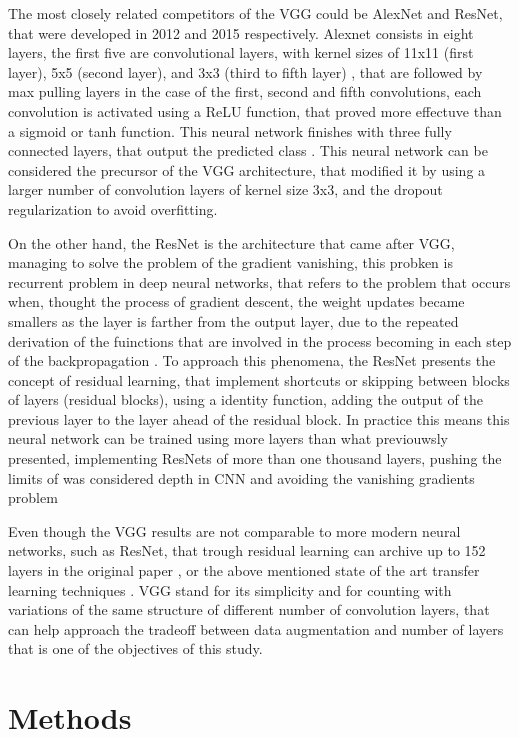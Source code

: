 \documentclass[10pt,twocolumn,letterpaper]{article}
\begin{document}
The most closely related competitors of the VGG could be AlexNet and ResNet, that were developed in 2012 and 2015 respectively. Alexnet consists in eight layers, the first five are convolutional layers, with kernel sizes of 11x11 (first layer), 5x5 (second layer), and 3x3 (third to fifth layer) , that are followed by max pulling layers in the case of the first, second and fifth convolutions, each convolution is activated using a ReLU function, that proved more effectuve than a sigmoid or tanh function. This neural network finishes with three fully connected layers, that output the predicted class \cite{Krizhevsky2012}. This neural network can be considered the precursor of the VGG architecture, that modified it by using a larger number of convolution layers of kernel size 3x3, and the dropout regularization to avoid overfitting.

On the other hand, the ResNet is the architecture that came after VGG, managing to solve the problem of the gradient vanishing, this probken is recurrent problem in deep neural networks, that refers to the problem that occurs when, thought the process of gradient descent, the weight updates became smallers as the layer is farther from the output layer, due to the repeated derivation of the fuinctions that are involved in the process becoming in each step of the backpropagation \cite{Aghdam2017,Skansi2018}. To approach this phenomena, the ResNet presents the concept of residual learning, that implement shortcuts or skipping between blocks of layers (residual blocks), using a identity function, adding the output of the previous layer to the layer ahead of the residual block. In practice this means this neural network can be trained using more layers than what previouwsly presented, implementing ResNets of more than one thousand  layers, pushing the limits of was considered depth in CNN and avoiding the vanishing gradients problem \cite{He2016,He2016a}

Even though the VGG results are not comparable to more modern neural networks, such as ResNet, that trough residual learning can archive up to 152 layers in the original paper \cite{He2016}, or the above mentioned state of the art transfer learning techniques \cite{Kolesnikov2019}. VGG stand for its simplicity and for counting with variations of the same structure of different number of convolution layers, that can help approach the tradeoff between data augmentation and number of layers that is one of the objectives of this study.


\section{Methods}
\end{document}
